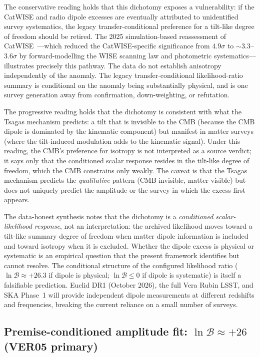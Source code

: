 The conservative reading holds that this dichotomy exposes a
vulnerability: if the CatWISE and radio dipole excesses are
eventually attributed to unidentified survey systematics, the
legacy transfer-conditional preference for a tilt-like degree of
freedom should be retired.  The 2025
simulation-based reassessment of
CatWISE~\cite{Bashir2025}---which reduced the
CatWISE-specific significance from $4.9\sigma$ to
$\sim\!3.3$--$3.6\sigma$ by forward-modelling the WISE scanning
law and photometric systematics---illustrates precisely this
pathway.  The data do not establish anisotropy independently of
the anomaly.  The legacy transfer-conditional likelihood-ratio summary is conditional on the anomaly
being substantially physical, and is one survey generation away
from confirmation, down-weighting, or refutation.

The progressive reading holds that the dichotomy is
consistent with what the Tsagas mechanism predicts: a tilt
that is invisible to the CMB (because the CMB dipole is
dominated by the kinematic component) but manifest in matter
surveys (where the tilt-induced modulation adds to the
kinematic signal).  Under this reading, the CMB's preference
for isotropy is not interpreted as a source verdict; it says only
that the conditioned scalar response resides in the tilt-like degree of freedom,
which the CMB constrains only weakly.  The caveat is that
the Tsagas mechanism predicts the \emph{qualitative}
pattern (CMB-invisible, matter-visible) but does not
uniquely predict the amplitude or the survey in which the
excess first appears.

The data-honest synthesis notes that the dichotomy is a
\emph{conditioned scalar-likelihood response}, not an interpretation:
the archived likelihood moves toward a tilt-like summary degree of
freedom when matter dipole information is included and toward isotropy
when it is excluded.  Whether the
dipole excess is physical or systematic is an empirical
question that the present framework identifies but cannot
resolve.  The conditional structure of the configured likelihood ratio
($\ln\mathcal{B} \approx +26.3$ if dipole is physical;
$\ln\mathcal{B} \leq 0$ if dipole is systematic) is itself a
falsifiable prediction.  Euclid DR1 (October 2026), the full
Vera Rubin LSST, and SKA Phase~1 will provide independent dipole
measurements at different redshifts and frequencies, breaking the
current reliance on a small number of surveys.


\subsection{Premise-conditioned amplitude fit: $\ln\mathcal{B} \approx +26$ (VER05 primary)}

